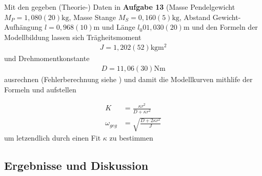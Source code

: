 \documentclass[11pt, a4paper]{article}
\begin{document}
    Mit den gegeben (Theorie-) Daten in \textbf{Aufgabe 13} \cite{pen} (Masse Pendelgewicht $M_P = 1,080(20)\si{\kilogram}$,
    Masse Stange $M_S = 0,160(5)\si{\kilogram}$, Abstand Gewicht-Aufhängung $l = 0,968(10)\si{\metre}$ und Länge $l_0 0 1,030(20)\si{\metre}$
    und den Formeln der Modellbildung \cite{modell}
    lassen sich Trägheitsmoment
    \begin{align}
        J = 1,202(52)\si{\kilogram\metre\squared} \label{J}
    \end{align}
    und Drehmomentkonstante
    \begin{align}
        D = 11,06(30)\si{\newton\metre} \label{D}
    \end{align} 
    ausrechnen (Fehlerberechnung siehe \cite[Formel (19)]{ABW}) und damit die Modellkurven
    mithlife der Formeln \cite[(30)]{pen} und \cite[(35)]{pen}
    aufstellen
    
    \begin{align}
        K &= \frac{\kappa r^2}{D + \kappa r^2} \label{Kkappa} \\
        \omega_{geg} &= \sqrt{\frac{D+2\kappa r^2}{J}} \label{Okappa}
    \end{align}
    um letzendlich durch einen Fit  $\kappa$ zu bestimmen

    \subsection{Ergebnisse und Diskussion}
\end{document}
